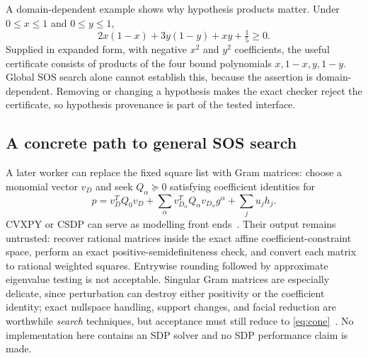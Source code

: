 A domain-dependent example shows why hypothesis products matter. Under
$0\le x\le1$ and $0\le y\le1$,
\[
 2x(1-x)+3y(1-y)+xy+\tfrac15\ge0 .
\]
Supplied in expanded form, with negative $x^2$ and $y^2$ coefficients, the
useful certificate consists of products of the four bound polynomials
$x,1-x,y,1-y$. Global SOS search alone cannot establish this, because the
assertion is domain-dependent. Removing or changing a hypothesis makes the exact
checker reject the certificate, so hypothesis provenance is part of the tested
interface.

\subsection{A concrete path to general SOS search}

A later worker can replace the fixed square list with Gram matrices: choose a
monomial vector $v_D$ and seek $Q_\alpha\succeq0$ satisfying coefficient
identities for
\[
 p= v_D^{T}Q_0v_D+\sum_\alpha v_{D_\alpha}^{T}Q_\alpha v_{D_\alpha}g^\alpha
     +\sum_j u_jh_j .
\]
CVXPY or CSDP can serve as modelling front ends~\cite{cvxpy,csdp}. Their output
remains untrusted: recover rational matrices inside the exact affine
coefficient-constraint space, perform an exact positive-semidefiniteness check,
and convert each matrix to rational weighted squares. Entrywise rounding
followed by approximate eigenvalue testing is not acceptable. Singular Gram
matrices are especially delicate, since perturbation can destroy either
positivity or the coefficient identity; exact nullspace handling, support
changes, and facial reduction are worthwhile \emph{search} techniques, but
acceptance must still reduce to \eqref{eq:cone}~\cite{rational-sos}. No
implementation here contains an SDP solver and no SDP performance claim is made.

